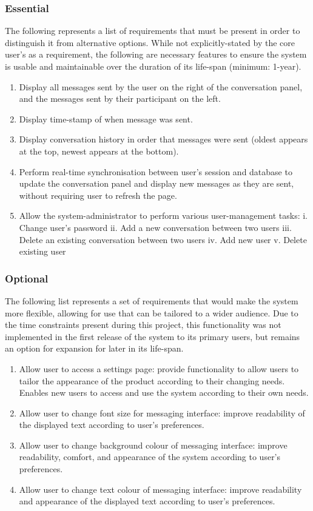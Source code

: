 \documentclass[11pt]{article}
\begin{document}
\subsubsection{Essential}
The following represents a list of requirements that must be present in order to distinguish it from
alternative options. While not explicitly-stated by the core user's as a requirement, the following
are necessary features to ensure the system is usable and maintainable over the duration of its
life-span (minimum: 1-year).
\begin{enumerate}
    \item Display all messages sent by the user on the right of the conversation panel, and
        the messages sent by their participant on the left.
    \item Display time-stamp of when message was sent.
    \item Display conversation history in order that messages were sent (oldest appears at the top,
        newest appears at the bottom).
    \item Perform real-time synchronisation between user's session and database to update the
        conversation panel and display new messages as they are sent, without requiring user to
        refresh the page.
    \item Allow the system-administrator to perform various user-management tasks:
        \subitem i. Change user's password
        \subitem ii. Add a new conversation between two users
        \subitem iii. Delete an existing conversation between two users
        \subitem iv. Add new user
        \subitem v. Delete existing user
\end{enumerate}

\subsubsection{Optional}
The following list represents a set of requirements that would make the system more flexible,
allowing for use that can be tailored to a wider audience. Due to the time constraints present
during this project, this functionality was not implemented in the first release of the system to
its primary users, but remains an option for expansion for later in its life-span.
\begin{enumerate}
    \item Allow user to access a settings page: provide functionality to allow users to tailor the
        appearance of the product according to their changing needs. Enables new users to access and
        use the system according to their own needs.
    \item Allow user to change font size for messaging interface: improve readability of the
        displayed text according to user's preferences.
    \item Allow user to change background colour of messaging interface: improve readability,
        comfort, and appearance of the system according to user's preferences.
    \item Allow user to change text colour of messaging interface: improve readability and
        appearance of the displayed text according to user's preferences.
\end{enumerate}
\end{document}
